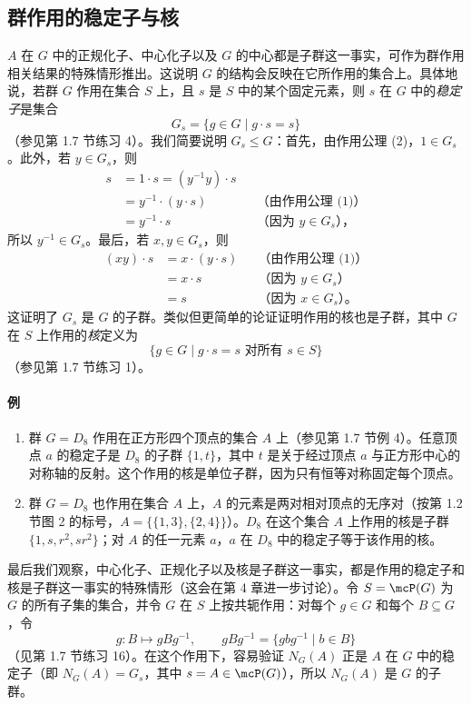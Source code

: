\subsection*{群作用的稳定子与核}

$A$ 在 $G$ 中的正规化子、中心化子以及 $G$ 的中心都是子群这一事实，可作为群作用相关结果的特殊情形推出。这说明 $G$ 的结构会反映在它所作用的集合上。具体地说，若群 $G$ 作用在集合 $S$ 上，且 $s$ 是 $S$ 中的某个固定元素，则 $s$ 在 $G$ 中的\emph{稳定子}是集合
\[
  G_s=\{g\in G\mid g\cdot s=s\}
\]
（参见第 1.7 节练习 4）。我们简要说明 $G_s\leq G$：首先，由作用公理 (2)，$1\in G_s$。此外，若 $y\in G_s$，则
\begin{align*}
  s &= 1\cdot s=(y^{-1}y)\cdot s\\
    &= y^{-1}\cdot (y\cdot s) &&\text{（由作用公理 (1)）}\\
    &= y^{-1}\cdot s &&\text{（因为 $y\in G_s$），}
\end{align*}
所以 $y^{-1}\in G_s$。最后，若 $x,y\in G_s$，则
\begin{align*}
  (xy)\cdot s &= x\cdot(y\cdot s) &&\text{（由作用公理 (1)）}\\
  &=x\cdot s &&\text{（因为 $y\in G_s$）}\\
  &=s &&\text{（因为 $x\in G_s$）。}
\end{align*}
这证明了 $G_s$ 是 $G$ 的子群。类似但更简单的论证证明作用的核也是子群，其中 $G$ 在 $S$ 上作用的\emph{核}定义为
\[
  \{g\in G\mid g\cdot s=s\text{ 对所有 }s\in S\}
\]
（参见第 1.7 节练习 1）。

\paragraph{例}
\begin{enumerate}[label=(\arabic*)]
  \item 群 $G=D_8$ 作用在正方形四个顶点的集合 $A$ 上（参见第 1.7 节例 4）。任意顶点 $a$ 的稳定子是 $D_8$ 的子群 $\{1,t\}$，其中 $t$ 是关于经过顶点 $a$ 与正方形中心的对称轴的反射。这个作用的核是单位子群，因为只有恒等对称固定每个顶点。
  \item 群 $G=D_8$ 也作用在集合 $A$ 上，$A$ 的元素是两对相对顶点的无序对（按第 1.2 节图 2 的标号，$A=\{\{1,3\},\{2,4\}\}$）。$D_8$ 在这个集合 $A$ 上作用的核是子群 $\{1,s,r^2,sr^2\}$；对 $A$ 的任一元素 $a$，$a$ 在 $D_8$ 中的稳定子等于该作用的核。
\end{enumerate}

最后我们观察，中心化子、正规化子以及核是子群这一事实，都是作用的稳定子和核是子群这一事实的特殊情形（这会在第 4 章进一步讨论）。令 $S=\mcP(G)$ 为 $G$ 的所有子集的集合，并令 $G$ 在 $S$ 上按共轭作用：对每个 $g\in G$ 和每个 $B\subseteq G$，令
\[
  g:B\mapsto gBg^{-1},\qquad gBg^{-1}=\{gbg^{-1}\mid b\in B\}
\]
（见第 1.7 节练习 16）。在这个作用下，容易验证 $N_G(A)$ 正是 $A$ 在 $G$ 中的稳定子（即 $N_G(A)=G_s$，其中 $s=A\in\mcP(G)$），所以 $N_G(A)$ 是 $G$ 的子群。

